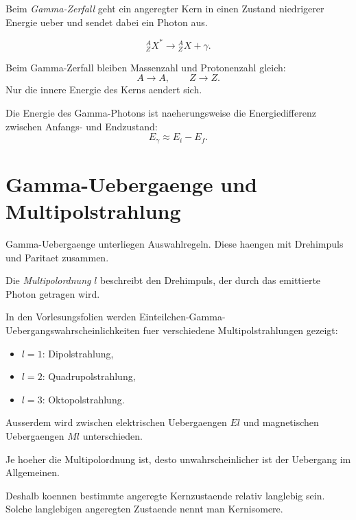 \begin{definitionbox}
Beim \emph{Gamma-Zerfall} geht ein angeregter Kern in einen Zustand niedrigerer
Energie ueber und sendet dabei ein Photon aus.
\end{definitionbox}

\begin{formulabox}
\[
    {}^{A}_{Z}X^*
    \rightarrow
    {}^{A}_{Z}X
    +
    \gamma.
\]
\end{formulabox}

\begin{conceptbox}
Beim Gamma-Zerfall bleiben Massenzahl und Protonenzahl gleich:
\[
    A \rightarrow A,
    \qquad
    Z \rightarrow Z.
\]
Nur die innere Energie des Kerns aendert sich.
\end{conceptbox}

\begin{definitionbox}
Die Energie des Gamma-Photons ist naeherungsweise die Energiedifferenz zwischen
Anfangs- und Endzustand:
\[
    E_\gamma \approx E_i-E_f.
\]
\end{definitionbox}

\section{Gamma-Uebergaenge und Multipolstrahlung}

Gamma-Uebergaenge unterliegen Auswahlregeln.
Diese haengen mit Drehimpuls und Paritaet zusammen.

\begin{definitionbox}
Die \emph{Multipolordnung} $l$ beschreibt den Drehimpuls, der durch das emittierte
Photon getragen wird.
\end{definitionbox}

\begin{notebox}
In den Vorlesungsfolien werden Einteilchen-Gamma-Uebergangswahrscheinlichkeiten fuer
verschiedene Multipolstrahlungen gezeigt:
\begin{itemize}
    \item $l=1$: Dipolstrahlung,
    \item $l=2$: Quadrupolstrahlung,
    \item $l=3$: Oktopolstrahlung.
\end{itemize}

Ausserdem wird zwischen elektrischen Uebergaengen $E l$ und magnetischen Uebergaengen
$M l$ unterschieden.
\end{notebox}

\begin{conceptbox}
Je hoeher die Multipolordnung ist, desto unwahrscheinlicher ist der Uebergang im
Allgemeinen.

Deshalb koennen bestimmte angeregte Kernzustaende relativ langlebig sein.
Solche langlebigen angeregten Zustaende nennt man Kernisomere.
\end{conceptbox}

